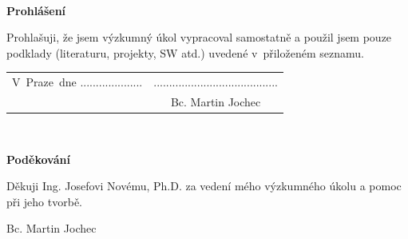 \documentclass[a4paper,twoside,12pt]{book}
\newcommand{\tb}{\textbf} %
\newcommand{\woman}{} %
\newcommand{\autor}{Bc. Martin Jochec}   %
\newcommand{\kde}{Praze} %
\newcommand{\prohlaseni}{Prohlašuji, že jsem výzkumný úkol vypracoval\woman{} samostatně a použil\woman{} jsem pouze podklady (literaturu, projekty, SW atd.) uvedené v~přiloženém seznamu.} %
\newcommand{\podekovani}{Děkuji Ing. Josefovi Novému, Ph.D. za vedení mého výzkumného úkolu a pomoc při jeho tvorbě.} %
\begin{document}
\newpage %
\thispagestyle{empty}  %

~ %
\vfill %

\tb{Prohlášení} %

\vspace{1em} %
\prohlaseni

\vspace{2em}  %
\hspace{-0.5em}\begin{tabularx}{\textwidth}{X c}  %
V~\kde\ dne .................... &........................................ \\	%
	& \autor
\end{tabularx}	%


\newpage
\thispagestyle{empty}

~
\vfill %


\tb{Poděkování}

\vspace{1em} %
\podekovani
\begin{flushright}
\autor
\end{flushright}  %


\newpage   %
\thispagestyle{empty}   %

\newbox\odstavecbox
\newlength\vyskaodstavce
\newcommand\odstavec[2]{%
    \setbox\odstavecbox=\hbox{%
         \parbox[t]{#1}{#2\vrule width 0pt depth 4pt}}%
    \global\vyskaodstavce=\dp\odstavecbox
    \box\odstavecbox}
\newcommand{\delka}{120mm} %
\end{document}

